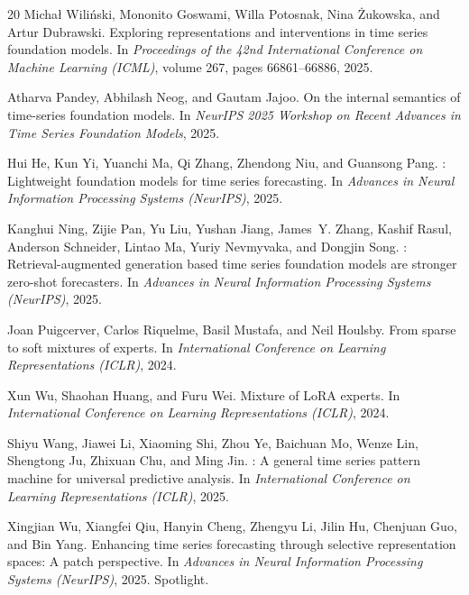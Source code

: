 \documentclass{article}
\begin{document}
\begin{thebibliography}{20}
Micha\l{} Wili\'{n}ski, Mononito Goswami, Willa Potosnak, Nina \.{Z}ukowska, and Artur Dubrawski.
\newblock Exploring representations and interventions in time series foundation models.
\newblock In \textit{Proceedings of the 42nd International Conference on Machine Learning (ICML)}, volume 267, pages 66861--66886, 2025.

Atharva Pandey, Abhilash Neog, and Gautam Jajoo.
\newblock On the internal semantics of time-series foundation models.
\newblock In \textit{NeurIPS 2025 Workshop on Recent Advances in Time Series Foundation Models}, 2025.

Hui He, Kun Yi, Yuanchi Ma, Qi Zhang, Zhendong Niu, and Guansong Pang.
: Lightweight foundation models for time series forecasting.
\newblock In \textit{Advances in Neural Information Processing Systems (NeurIPS)}, 2025.

Kanghui Ning, Zijie Pan, Yu Liu, Yushan Jiang, James~Y. Zhang, Kashif Rasul, Anderson Schneider, Lintao Ma, Yuriy Nevmyvaka, and Dongjin Song.
: Retrieval-augmented generation based time series foundation models are stronger zero-shot forecasters.
\newblock In \textit{Advances in Neural Information Processing Systems (NeurIPS)}, 2025.

Joan Puigcerver, Carlos Riquelme, Basil Mustafa, and Neil Houlsby.
\newblock From sparse to soft mixtures of experts.
\newblock In \textit{International Conference on Learning Representations (ICLR)}, 2024.

Xun Wu, Shaohan Huang, and Furu Wei.
\newblock Mixture of {LoRA} experts.
\newblock In \textit{International Conference on Learning Representations (ICLR)}, 2024.

Shiyu Wang, Jiawei Li, Xiaoming Shi, Zhou Ye, Baichuan Mo, Wenze Lin, Shengtong Ju, Zhixuan Chu, and Ming Jin.
: A general time series pattern machine for universal predictive analysis.
\newblock In \textit{International Conference on Learning Representations (ICLR)}, 2025.

Xingjian Wu, Xiangfei Qiu, Hanyin Cheng, Zhengyu Li, Jilin Hu, Chenjuan Guo, and Bin Yang.
\newblock Enhancing time series forecasting through selective representation spaces: A patch perspective.
\newblock In \textit{Advances in Neural Information Processing Systems (NeurIPS)}, 2025.
\newblock Spotlight.


\end{thebibliography}
\end{document}
